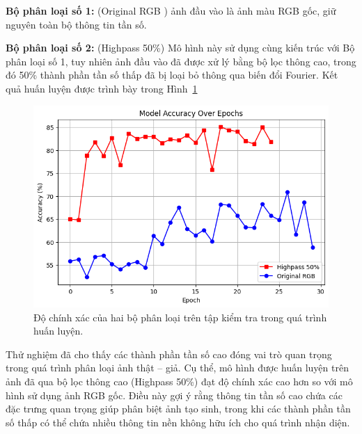 \textbf{Bộ phân loại số 1:} (Original RGB ) ảnh đầu vào là ảnh màu RGB gốc, giữ nguyên toàn bộ thông tin tần số.  

\textbf{Bộ phân loại số 2:} (Highpass 50\%) Mô hình này sử dụng cùng kiến trúc với Bộ phân loại số 1, tuy nhiên ảnh đầu vào đã được xử lý bằng bộ lọc thông cao, trong đó 50\% thành phần tần số thấp đã bị loại bỏ thông qua biến đổi Fourier. Kết quả huấn luyện được trình bày trong Hình~\ref{fig:Experiment_Highpass50_percent}

%
\begin{figure}[h!]
	\centering
	\includegraphics[width=1.0\linewidth]{Images/Experiment_Highpass50_percent.png}
	\begin{minipage}{1.0\linewidth}
		\caption{Độ chính xác của hai bộ phân loại trên tập kiểm tra trong quá trình huấn luyện.}
		\label{fig:Experiment_Highpass50_percent}
	\end{minipage}
\end{figure}

%
Thử nghiệm đã cho thấy các thành phần tần số cao đóng vai trò quan trọng trong quá trình phân loại ảnh thật – giả. Cụ thể, mô hình được huấn luyện trên ảnh đã qua bộ lọc thông cao (Highpass 50\%) đạt độ chính xác cao hơn so với mô hình sử dụng ảnh RGB gốc. Điều này gợi ý rằng thông tin tần số cao chứa các đặc trưng quan trọng giúp phân biệt ảnh tạo sinh, trong khi các thành phần tần số thấp có thể chứa nhiều thông tin nền không hữu ích cho quá trình nhận diện.  


%

